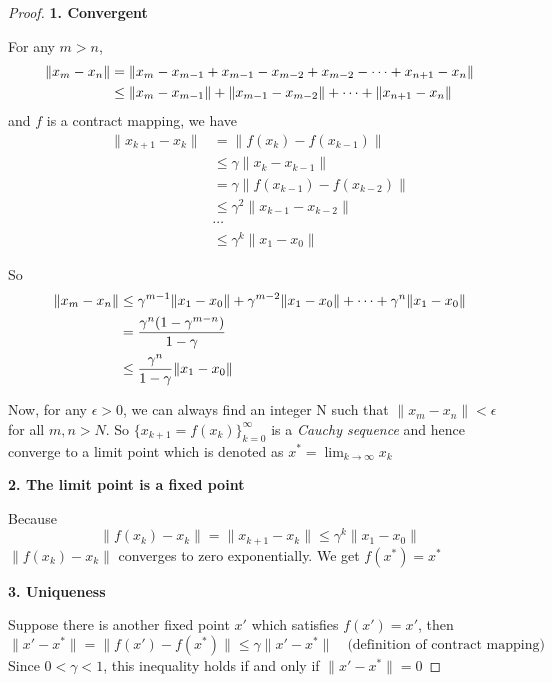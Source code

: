 \begin{proof}
	\textbf{1. Convergent} \par
	For any $m>n$,
	\begin{align*}
		\|x_m-x_n\| & = \|x_m-x_{m-1}+x_{m-1}-x_{m-2}+x_{m-2}-\cdots +x_{n+1}-x_n\| \notag     \\
		            & \le \|x_m-x_{m-1}\| +\|x_{m-1}-x_{m-2}\| +\cdots +\|x_{n+1}-x_n\| \notag \\
	\end{align*}
	and $f$ is a contract mapping, we have
	\begin{align*}
		\|x_{k+1}-x_k\| & = \|f(x_k)-f(x_{k-1})\|            \\
		                & \le \gamma \|x_k-x_{k-1}\|         \\
		                & = \gamma \|f(x_{k-1})-f(x_{k-2})\| \\
		                & \le \gamma ^2 \|x_{k-1}-x_{k-2}\|  \\
		                & \cdots                             \\
		                & \le \gamma ^k \|x_1-x_0\|
	\end{align*}

	So
	\begin{align}
		\|x_m-x_n\| & \le \gamma ^{m-1}\|x_1-x_0\| + \gamma^{m-2}\|x_1-x_0\|+\cdots +\gamma^{n}\|x_1-x_0\| \notag \\
		            & = \frac{\gamma ^{n}(1-\gamma^{m-n})}{1-\gamma } \notag                                      \\
		            & \le \frac{\gamma ^{n}}{1-\gamma }\|x_1-x_0\|
	\end{align}

	Now, for any $\epsilon>0$, we can always find an integer N such that $\|x_{m}-x_{n}\|<\epsilon$ for all $m,n>N$. So
	$\{x_{k+1}=f(x_k)\}_{k=0}^{\infty}$ is a \emph{Cauchy sequence} and hence converge to a limit point which is denoted as $x^*=\lim_{k\to
			\infty}x_k$ \newline

	\textbf{2. The limit point is a fixed point} \par
	Because
	\begin{equation*}
		\|f(x_k)-x_k\| = \|x_{k+1}-x_k\| \le \gamma ^k\|x_1-x_0\|
	\end{equation*}
	$\|f(x_{k})-x_{k}\|$ converges to zero exponentially. We get $f(x^{*})=x^*$ \newline

	\textbf{3. Uniqueness} \par
	Suppose there is another fixed point $x'$ which satisfies $f(x')=x'$, then
	\begin{equation}
		\|x'-x^*\|=\|f(x')-f(x^*)\|\le \gamma \|x'-x^*\| \quad \text{(definition of contract mapping)}
	\end{equation}
	Since $0<\gamma<1$, this inequality holds if and only if $\|x' -x^*\|=0$
\end{proof}

